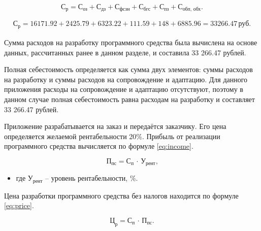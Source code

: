 \noindent
\begin{minipage}{1\linewidth}
\begin{equation}\label{eq:sum_expenses}
  \text{С}_\text{р} = \text{С}_\text{оз} + \text{С}_\text{дз} + \text{С}_\text{фсзн} + \text{С}_\text{бгс} + \text{С}_\text{пз} + \text{С}_\text{обп, обх}\text{.}
\end{equation}
\end{minipage}

\begin{gather*}
  \text{С}_\text{р} = 16171.92 + 2425.79 + 6323.22 + 111.59 + 148 + 6885.96 = 33266.47\,\text{руб.}
\end{gather*}

Сумма расходов на разработку программного средства была вычислена на основе данных, рассчитанных ранее в данном разделе, и составила 33 266.47 рублей.

Полная себестоимость определяется как сумма двух элементов: суммы расходов на разработку и суммы расходов на сопровождение и адаптацию. Для данного приложения расходы на сопровождение и адаптацию отсутствуют, поэтому в данном случае полная себестоимость равна расходам на разработку и составляет 33 266.47 рублей.


Приложение разрабатывается на заказ и передаётся заказчику. Его цена определяется желаемой рентабельности 20\%. Прибыль от реализации программного средства вычисляется по формуле \ref{eq:income}.

\noindent
\begin{minipage}{1\linewidth}
\begin{equation}\label{eq:income}
  \text{П}_\text{пс} = \text{С}_\text{п}\,\cdot\,\text{У}_\text{рент}\text{,}
\end{equation}
\begin{itemize}[nosep, leftmargin=0pt, labelindent=0pt, itemsep=0pt, parsep=0pt]
  \item[] где $\text{У}_\text{рент}$ -- уровень рентабельности, \%.
\end{itemize}
\end{minipage}

Цена разработки программного средства без налогов находится по формуле \ref{eq:price}.

\noindent
\begin{minipage}{1\linewidth}
\begin{equation}\label{eq:price}
  \text{Ц}_\text{р} = \text{С}_\text{п}\,\cdot\,\text{П}_\text{пс}\text{.}
\end{equation}
\end{minipage}

